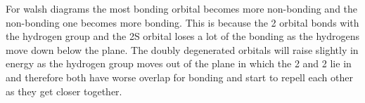For  walsh diagrams the most bonding orbital becomes more non-bonding and the non-bonding one becomes more bonding. This is because the 2 orbital bonds with the hydrogen group and the 2S orbital loses a lot of the bonding as the hydrogens move down below the plane. The doubly degenerated orbitals will raise slightly in energy as the hydrogen group moves out of the plane in which the 2 and 2 lie in and therefore both have worse overlap for bonding and start to repell each other as they get closer together.

